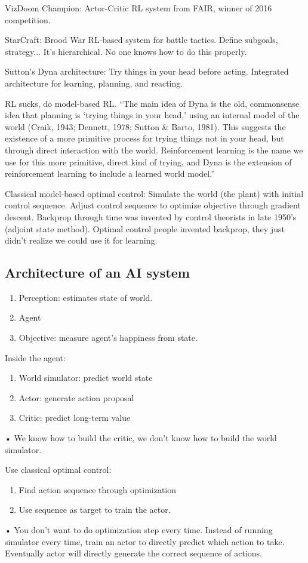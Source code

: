 VizDoom Champion: Actor-Critic RL system from FAIR, winner of 2016 competition.

StarCraft: Brood War RL-based system for battle tactics. Define subgoals, strategy... It's hierarchical. No one knows how to do this properly.

Sutton's Dyna architecture: Try things in your head before acting. Integrated architecture for learning, planning, and reacting.

RL sucks, do model-based RL. ``The main idea of Dyna is the old, commonsense idea that
planning is `trying things in your head,' using an internal
model of the world (Craik, 1943; Dennett, 1978; Sutton \&
Barto, 1981). This suggests the existence of a more primitive
process for trying things not in your head, but through direct
interaction with the world. Reinforcement learning is the
name we use for this more primitive, direct kind of trying,
and Dyna is the extension of reinforcement learning to include
a learned world model.''

Classical model-based optimal control: 
Simulate the world (the plant) with initial control sequence. Adjust control sequence to optimize objective through gradient descent. Backprop through time was invented by control theorists in late 1950's (adjoint state method). 
Optimal control people invented backprop, they just didn't realize we could use it for learning.

\subsection{Architecture of an AI system}
\begin{enumerate}
\item
Perception: estimates state of world.
\item
Agent
\item
Objective: measure agent's happiness from state. 
\end{enumerate}
Inside the agent:
\begin{enumerate}
\item
World simulator: predict world state
\item
Actor: generate action proposal
\item
Critic: predict long-term value
\end{enumerate}•
We know how to build the critic, we don't know how to build the world simulator. 

Use classical optimal control:
\begin{enumerate}
\item
Find action sequence through optimization
\item
Use sequence as target to train the actor.
\end{enumerate}•
You don't want to do optimization step every time. Instead of running simulator every time, train an actor to directly predict which action to take. 
Eventually actor will directly generate the correct sequence of actions.

